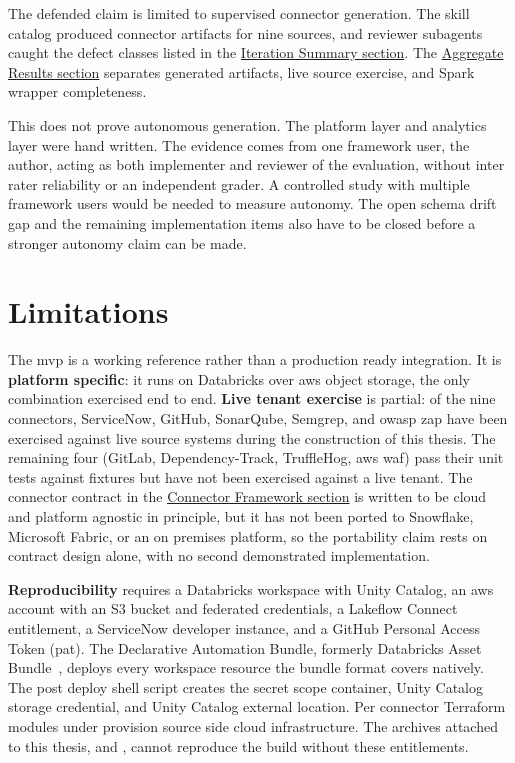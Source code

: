 The defended claim is limited to supervised connector generation. The skill catalog produced connector artifacts for nine sources, and reviewer subagents caught the defect classes listed in the \hyperref[sec:iteration-summary]{Iteration Summary section}. The \hyperref[sec:impl-results]{Aggregate Results section} separates generated artifacts, live source exercise, and Spark wrapper completeness.

This does not prove autonomous generation. The platform layer and analytics layer were hand written. The evidence comes from one framework user, the author, acting as both implementer and reviewer of the evaluation, without inter rater reliability or an independent grader. A controlled study with multiple framework users would be needed to measure autonomy. The open schema drift gap and the remaining implementation items also have to be closed before a stronger autonomy claim can be made.

\section*{Limitations}
\label{sec:conclusion-limitations}

The \gls{mvp} is a working reference rather than a production ready integration. It is \textbf{platform specific}: it runs on Databricks over \gls{aws} object storage, the only combination exercised end to end. \textbf{Live tenant exercise} is partial: of the nine connectors, ServiceNow, GitHub, SonarQube, Semgrep, and \gls{owasp} \gls{zap} have been exercised against live source systems during the construction of this thesis. The remaining four (GitLab, Dependency-Track, TruffleHog, \gls{aws} \gls{waf}) pass their unit tests against fixtures but have not been exercised against a live tenant. The connector contract in the \hyperref[sec:connector-framework]{Connector Framework section} is written to be cloud and platform agnostic in principle, but it has not been ported to Snowflake, Microsoft Fabric, or an on premises platform, so the portability claim rests on contract design alone, with no second demonstrated implementation.

\textbf{Reproducibility} requires a Databricks workspace with Unity Catalog, an \gls{aws} account with an S3 bucket and federated credentials, a Lakeflow Connect entitlement, a ServiceNow developer instance, and a GitHub Personal Access Token (\gls{pat}). The Declarative Automation Bundle, formerly Databricks Asset Bundle~\parencite{DatabricksDAB2026}, deploys every workspace resource the bundle format covers natively. The post deploy shell script  creates the secret scope container, Unity Catalog storage credential, and Unity Catalog external location. Per connector Terraform modules under  provision source side cloud infrastructure. The archives attached to this thesis,  and , cannot reproduce the build without these entitlements.

